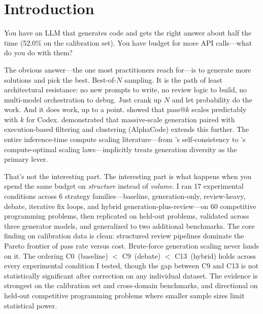 \documentclass{article}
\begin{document}
\section{Introduction}

You have an LLM that generates code and gets the right answer about half the time (52.0\% on the calibration set). You have budget for more API calls---what do you do with them?

The obvious answer---the one most practitioners reach for---is to generate more solutions and pick the best. Best-of-$N$ sampling. It is the path of least architectural resistance: no new prompts to write, no review logic to build, no multi-model orchestration to debug. Just crank up $N$ and let probability do the work. And it does work, up to a point. \citet{chen2021evaluating} showed that pass@$k$ scales predictably with $k$ for Codex. \citet{li2022competition} demonstrated that massive-scale generation paired with execution-based filtering and clustering (AlphaCode) extends this further. The entire inference-time compute scaling literature---from \citet{wang2023selfconsistency}'s self-consistency to \citet{snell2024scaling}'s compute-optimal scaling laws---implicitly treats generation diversity as the primary lever.

That's not the interesting part. The interesting part is what happens when you spend the same budget on \emph{structure} instead of \emph{volume}. I ran 17 experimental conditions across 6 strategy families---baseline, generation-only, review-heavy, debate, iterative fix loops, and hybrid generation-plus-review---on 60 competitive programming problems, then replicated on held-out problems, validated across three generator models, and generalized to two additional benchmarks. The core finding on calibration data is clean: structured review pipelines dominate the Pareto frontier of pass rate versus cost. Brute-force generation scaling never lands on it. The ordering C0~(baseline) $<$ C9~(debate) $<$ C13~(hybrid) holds across every experimental condition I tested, though the gap between C9 and C13 is not statistically significant after correction on any individual dataset. The evidence is strongest on the calibration set and cross-domain benchmarks, and directional on held-out competitive programming problems where smaller sample sizes limit statistical power.
\end{document}
